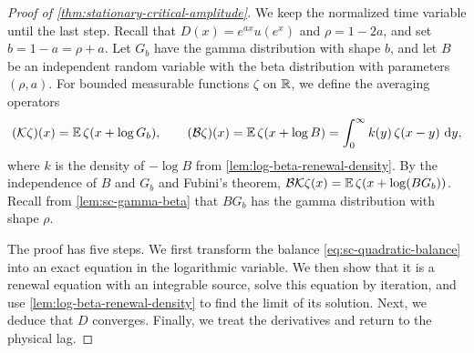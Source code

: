 \begin{proof}[Proof of \cref{thm:stationary-critical-amplitude}]
We keep the normalized time variable until the last step. Recall that $D(x)=e^{ax}u(e^x)$ and $\rho=1-2a$, and set $b=1-a=\rho+a$. Let $G_b$ have the gamma distribution with shape $b$, and let $B$ be an independent random variable with the beta distribution with parameters $(\rho,a)$. For bounded measurable functions $\zeta$ on $\mathbb R$, we define the averaging operators
\[
 (\mathcal K\zeta)(x)=\mathbb E\,\zeta(x+\log G_b),\qquad
 (\mathcal B\zeta)(x)=\mathbb E\,\zeta(x+\log B)=\int_0^\infty k(y)\,\zeta(x-y)\,\mathop{}\!\mathrm d y,
\]
where $k$ is the density of $-\log B$ from \cref{lem:log-beta-renewal-density}. By the independence of $B$ and $G_b$ and Fubini's theorem, $\mathcal B\mathcal K\zeta(x)=\mathbb E\,\zeta(x+\log(BG_b))$. Recall from \cref{lem:sc-gamma-beta} that $BG_b$ has the gamma distribution with shape $\rho$.

The proof has five steps. We first transform the balance \eqref{eq:sc-quadratic-balance} into an exact equation in the logarithmic variable. We then show that it is a renewal equation with an integrable source, solve this equation by iteration, and use \cref{lem:log-beta-renewal-density} to find the limit of its solution. Next, we deduce that $D$ converges. Finally, we treat the derivatives and return to the physical lag.


\end{proof}
